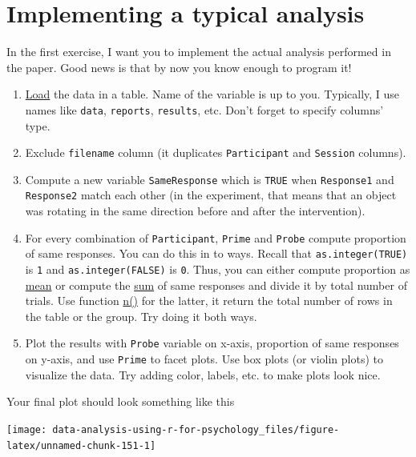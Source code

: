 \documentclass[
]{book}
\providecommand{\tightlist}{%
  \setlength{\itemsep}{0pt}\setlength{\parskip}{0pt}}
\begin{document}
\hypertarget{implementing-a-typical-analysis}{%
\section{Implementing a typical analysis}\label{implementing-a-typical-analysis}}

In the first exercise, I want you to implement the actual analysis performed in the paper. Good news is that by now you know enough to program it!

\begin{enumerate}
\def\labelenumi{\arabic{enumi}.}
\tightlist
\item
  \protect\hyperlink{readr}{Load} the data in a table. Name of the variable is up to you. Typically, I use names like \texttt{data}, \texttt{reports}, \texttt{results}, etc. Don't forget to specify columns' type.
\item
  Exclude \texttt{filename} column (it duplicates \texttt{Participant} and \texttt{Session} columns).
\item
  Compute a new variable \texttt{SameResponse} which is \texttt{TRUE} when \texttt{Response1} and \texttt{Response2} match each other (in the experiment, that means that an object was rotating in the same direction before and after the intervention).
\item
  For every combination of \texttt{Participant}, \texttt{Prime} and \texttt{Probe} compute proportion of same responses. You can do this in to ways. Recall that \texttt{as.integer(TRUE)} is \texttt{1} and \texttt{as.integer(FALSE)} is \texttt{0}. Thus, you can either compute proportion as \href{https://stat.ethz.ch/R-manual/R-patched/library/base/html/mean.html}{mean} or compute the \href{https://stat.ethz.ch/R-manual/R-patched/library/base/html/sum.html}{sum} of same responses and divide it by total number of trials. Use function \href{https://dplyr.tidyverse.org/reference/n.html}{n()} for the latter, it return the total number of rows in the table or the group. Try doing it both ways.
\item
  Plot the results with \texttt{Probe} variable on x-axis, proportion of same responses on y-axis, and use \texttt{Prime} to facet plots. Use box plots (or violin plots) to visualize the data. Try adding color, labels, etc. to make plots look nice.
\end{enumerate}

Your final plot should look something like this

\begin{center}\texttt{[image: data-analysis-using-r-for-psychology\_files/figure-latex/unnamed-chunk-151-1]} \end{center}
\end{document}
